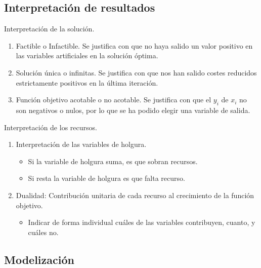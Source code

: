 \documentclass[12pt, twoside, openright]{report} %
\begin{document}
\subsection{Interpretación de resultados}

Interpretación de la solución.

\begin{enumerate}
	\item Factible o Infactible. Se justifica con que no haya salido un valor positivo en las variables artificiales en la solución óptima.
	\item Solución única o infinitas. Se justifica con que nos han salido
	      costes reducidos estrictamente positivos en la última iteración.
	\item Función objetivo acotable o no acotable. Se justifica con que el
	      \(y_i\) de \(x_i\) no son negativos o nulos, por lo que se ha
	      podido elegir una variable de salida.
\end{enumerate}

Interpretación de los recursos.

\begin{enumerate}
	\item Interpretación de las variables de holgura.
	      \begin{itemize}
		      \item Si la variable de holgura suma, es que sobran recursos.
		      \item Si resta la variable de holgura es que falta recurso.
	      \end{itemize}
	\item Dualidad: Contribución unitaria de cada recurso al crecimiento de
	      la función objetivo.

	      \begin{itemize}
		      \item Indicar de forma individual cuáles de las variables contribuyen,
		            cuanto, y cuáles no.
	      \end{itemize}
\end{enumerate}
\pagebreak
\subsection{Modelización}
\end{document}
